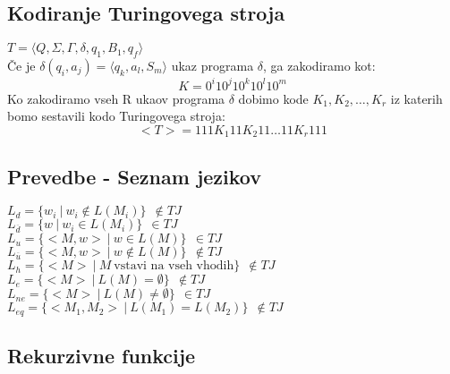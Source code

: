 \documentclass[a4paper]{article}
\begin{document}
\begin{multicols}{2}

\subsection*{Kodiranje Turingovega stroja}
$T=\langle Q,\Sigma,\Gamma,\delta,q_1,B_1,q_f \rangle$ \\
Če je $\delta(q_i,a_j)=\langle q_k, a_l, S_m \rangle$ ukaz programa $\delta$, ga zakodiramo kot:
	\[ K=0^i 1 0^j 1 0^k 1 0^l 1 0^m\]
Ko zakodiramo vseh R ukaov programa $\delta$ dobimo kode $K_1, K_2, \dots, K_r$ iz katerih bomo sestavili kodo Turingovega stroja:
	\[ <T> = 111 K_1 11 K_2 11 \dots 11 K_r 111\]%

\subsection*{Prevedbe - Seznam jezikov}
$L_d = \lbrace w_i \ | \ w_i \not\in L(M_i) \rbrace \ \ \not\in TJ $ \\
$L_{\overline{d}} = \lbrace w \ | \ w_i \in L(M_i) \rbrace \ \ \in TJ $ \\
$L_u = \lbrace <M,w> \ | \ w \in L(M) \rbrace \ \ \in TJ $ \\
$L_{\overline{u}} = \lbrace <M,w> \ | \ w \not\in L(M) \rbrace \ \ \not\in TJ $ \\
$L_h = \lbrace <M> \ | \ M \ \text{vstavi na vseh vhodih} \rbrace \ \ \not\in TJ $ \\
$L_e = \lbrace <M> \ | \ L(M) = \emptyset \rbrace \ \ \not\in TJ $ \\
$L_{ne} = \lbrace <M> \ | \ L(M) \neq \emptyset \rbrace \ \ \in TJ $ \\
$L_{eq} = \lbrace <M_1,M_2> \ | \ L(M_1) = L(M_2) \rbrace \ \ \not\in TJ $ \\

\subsection*{Rekurzivne funkcije}
\begin{enumerate}


\end{enumerate}
\end{multicols}
\end{document}
